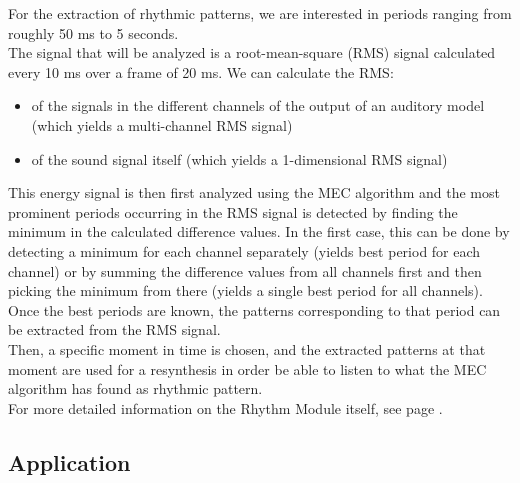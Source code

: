 For the extraction of rhythmic patterns, we are interested in
periods ranging from roughly 50 ms to 5 seconds.\\
The signal that will be analyzed is a root-mean-square (RMS)
signal calculated every 10 ms over a frame of 20 ms. We can
calculate the RMS:
\begin{itemize}
\item of the signals in the different channels of the output of
an auditory model (which yields a multi-channel RMS signal)
\item of the sound signal itself (which yields a 1-dimensional RMS signal)
\end{itemize}
This energy signal is then first analyzed using the MEC algorithm
and the most prominent periods occurring in the RMS signal is
detected by finding the minimum in the calculated difference
values. In the first case, this can be done by detecting a minimum
for each channel separately (yields best period for each channel)
or by summing the difference values from all channels first and then
picking the minimum from there (yields a single best period for all channels).\\
Once the best periods are known, the patterns corresponding to
that period can be extracted from the RMS signal.\\
Then, a specific moment in time is chosen, and the extracted
patterns at that moment are used for a resynthesis in order be
able to listen to what the MEC algorithm has found as rhythmic
pattern.\\
For more detailed information on the Rhythm Module itself, see
page \pageref{Concepts:RhythmModule}.\\

\subsection{Application}

